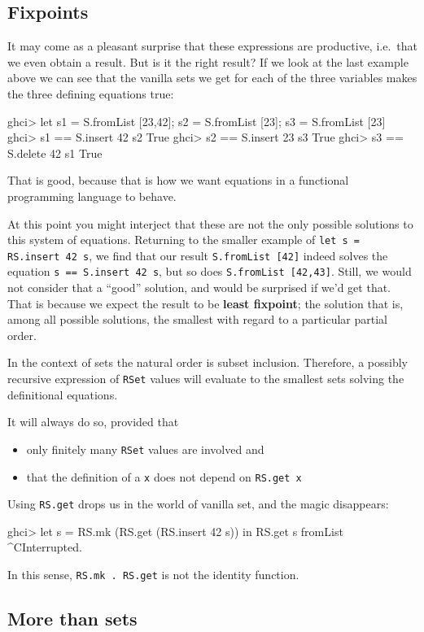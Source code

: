 \documentclass[manuscript,anonymous,screen,acmsmall]{acmart}
\begin{document}
\subsection{Fixpoints}

It may come as a pleasant surprise that these expressions are productive, i.e.\ that we even obtain a result. But is it the right result? If we look at the last example above we can see that the vanilla sets we get for each of the three variables makes the three defining equations true:
\begin{code}
ghci> let s1 = S.fromList [23,42]; s2 = S.fromList [23]; s3 = S.fromList [23]
ghci> s1 == S.insert 42 s2
True
ghci> s2 == S.insert 23 s3
True
ghci> s3 == S.delete 42 s1
True
\end{code}

That is good, because that is how we want equations in a functional programming language to behave.

At this point you might interject that these are not the only possible solutions to this system of equations. Returning to the smaller example of \verb|let s = RS.insert 42 s|, we find that our result \verb|S.fromList [42]| indeed solves the equation \verb|s == S.insert 42 s|, but so does \verb|S.fromList [42,43]|. Still, we would not consider that a “good” solution, and would be surprised if we'd get that.
%
That is because we expect the result to be \textbf{least fixpoint}; the solution that is, among all possible solutions, the smallest with regard to a particular partial order.

In the context of sets the natural order is subset inclusion. Therefore, a possibly recursive expression of \verb|RSet| values will evaluate to the smallest sets solving the definitional equations.

It will always do so, provided that
\begin{itemize}
\item only finitely many \verb|RSet| values are involved and
\item that the definition of a \verb|x| does not depend on \verb|RS.get x|
\end{itemize}
Using \verb|RS.get| drops us in the world of vanilla set, and the magic disappears:
\begin{code}
ghci> let s = RS.mk (RS.get (RS.insert 42 s)) in RS.get s
fromList ^CInterrupted.
\end{code}
In this sense, \verb|RS.mk . RS.get| is not the identity function.

\subsection{More than sets}
\end{document}
